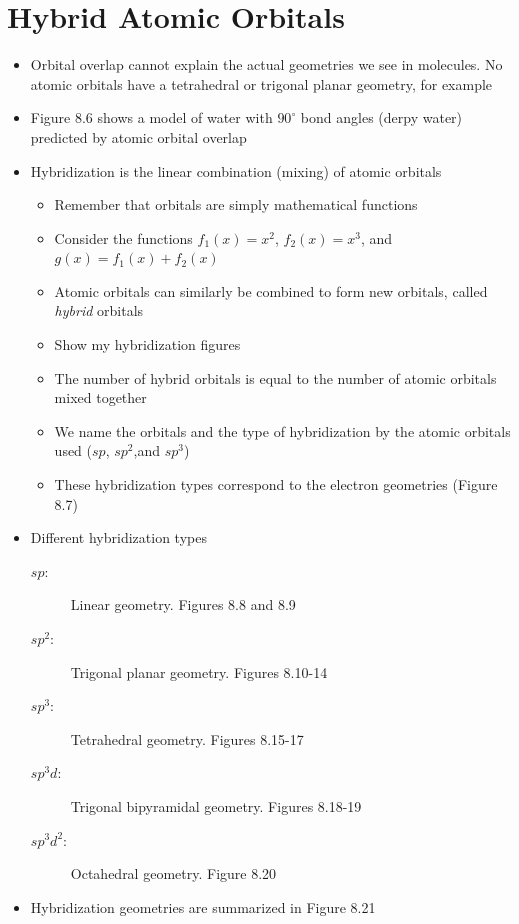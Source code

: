 \documentclass[12pt, openany, letterpaper]{memoir}
\begin{document}
\section{Hybrid Atomic Orbitals}
\begin{itemize}
  \item Orbital overlap cannot explain the actual geometries we see in molecules. No atomic orbitals have a tetrahedral or trigonal planar geometry, for example 
  \item Figure 8.6 shows a model of water with $90^\circ$ bond angles (derpy water) predicted by atomic orbital overlap
  \item Hybridization is the linear combination (mixing) of atomic orbitals
    \begin{itemize}
      \item Remember that orbitals are simply mathematical functions
      \item Consider the functions $f_1(x) = x^2$, $f_2(x) = x^3$, and $g(x) = f_1(x) + f_2(x)$
      \item Atomic orbitals can similarly be combined to form new orbitals, called \emph{hybrid} orbitals
      \item Show my hybridization figures
      \item The number of hybrid orbitals is equal to the number of atomic orbitals mixed together
      \item We name the orbitals and the type of hybridization by the atomic orbitals used ($sp$, $sp^2$,and $sp^3$)
      \item These hybridization types correspond to the electron geometries (Figure 8.7)
    \end{itemize}
  \item Different hybridization types
    \begin{description}
      \item[$sp$:] Linear geometry. Figures 8.8 and 8.9
      \item[$sp^2$:] Trigonal planar geometry. Figures 8.10-14
      \item[$sp^3$:] Tetrahedral geometry. Figures 8.15-17
      \item[$sp^3d$:] Trigonal bipyramidal geometry. Figures 8.18-19
      \item[$sp^3d^2$:] Octahedral geometry. Figure 8.20
    \end{description}
  \item Hybridization geometries are summarized in Figure 8.21
\end{itemize}
\end{document}
